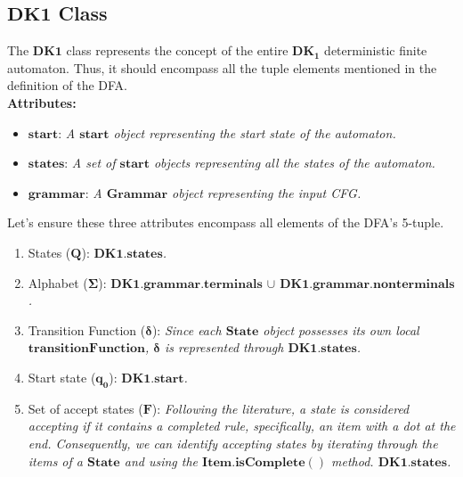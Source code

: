 \vspace{10pt}

\subsection{\(\boldsymbol{DK1}\) Class}

The \(\boldsymbol{DK1}\) class represents the concept of the entire \(\boldsymbol{DK_{1}}\) deterministic finite automaton. Thus, it should encompass all the tuple elements mentioned in the definition of the DFA.\\

\textbf{Attributes:}
\begin{itemize}
    \item \(\boldsymbol{start}\): \textit{A \(\boldsymbol{start}\) object representing the start state of the automaton.}
    \item \(\boldsymbol{states}\): \textit{A set of \(\boldsymbol{start}\) objects representing all the states of the automaton.}
    \item \(\boldsymbol{grammar}\): \textit{A \(\boldsymbol{Grammar}\) object representing the input CFG.}
\end{itemize}

Let's ensure these three attributes encompass all elements of the DFA's 5-tuple.

\begin{enumerate}
    \item States (\(\boldsymbol{Q}\)):  \textit{\(\boldsymbol{DK1.states}\).}
    \item Alphabet (\(\boldsymbol{\Sigma}\)):  \textit{\(\boldsymbol{DK1.grammar.terminals}\) \(\cup\) \(\boldsymbol{DK1.grammar.nonterminals}\).}
    \item Transition Function (\(\boldsymbol{\delta}\)):  \textit{Since each \(\boldsymbol{State}\) object possesses its own local \(\boldsymbol{transitionFunction}\), \(\boldsymbol{\delta}\) is represented through \(\boldsymbol{DK1.states}\).}
    \item Start state (\(\boldsymbol{q_{0}}\)):  \textit{\(\boldsymbol{DK1.start}\).}
    \item Set of accept states (\(\boldsymbol{F}\)):  \textit{Following the literature, a state is considered accepting if it contains a completed rule, specifically, an item with a dot at the end. Consequently, we can identify accepting states by iterating through the items of a \(\boldsymbol{State}\) and using the \(\boldsymbol{Item.isComplete()}\) method. \(\boldsymbol{DK1.states}\).}
\end{enumerate}


